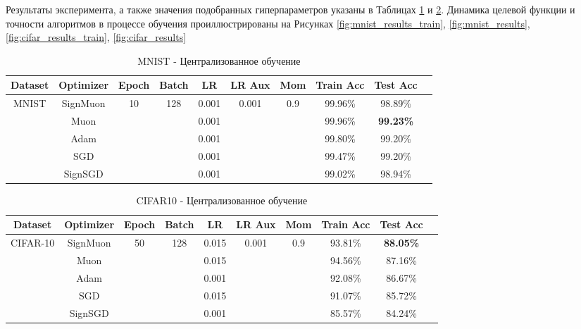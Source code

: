 \documentclass{article}
\begin{document}
Результаты эксперимента, а также значения подобранных гиперпараметров указаны в Таблицах \ref{tab:mnist_central} и \ref{tab:cifar_central}. Динамика целевой функции и точности алгоритмов в процессе обучения проиллюстрированы на Рисунках \ref{fig:mnist_results_train}, \ref{fig:mnist_results}, \ref{fig:cifar_results_train}, \ref{fig:cifar_results}
\vspace{-1em}
\begin{table}[h]
\centering
\caption{MNIST - Централизованное обучение}
\label{tab:mnist_central}
\small
\renewcommand{\arraystretch}{1.2}
\begin{tabular}{|c|c|c|c|c|c|c|c|c|c|}
\hline
\textbf{Dataset} & \textbf{Optimizer} & \textbf{Epoch} & \textbf{Batch} & \textbf{LR} & \textbf{LR Aux} & \textbf{Mom} & \textbf{Train Acc} & \textbf{Test Acc} \\
\hline
\multirow{5}{*}{MNIST} & SignMuon & \multirow{5}{*}{10} & \multirow{5}{*}{128} & 0.001 & \multirow{5}{*}{0.001} & \multirow{5}{*}{0.9} & 99.96\% & 98.89\% \\
\cline{2-2} \cline{5-5} \cline{8-9}
 & Muon & & & 0.001 & & & 99.96\% & \textbf{99.23\%} \\
\cline{2-2} \cline{5-5} \cline{8-9}
 & Adam & & & 0.001 & & & 99.80\% & 99.20\% \\
\cline{2-2} \cline{5-5} \cline{8-9}
 & SGD & & & 0.001 & & & 99.47\% & 99.20\% \\
\cline{2-2} \cline{5-5} \cline{8-9}
 & SignSGD & & & 0.001 & & & 99.02\% & 98.94\% \\
\hline
\end{tabular}
\end{table}

\vspace{-2em} 

\begin{table}[H]
\centering
\caption{CIFAR10 - Централизованное обучение}
\label{tab:cifar_central}
\small
\renewcommand{\arraystretch}{1.2}
\begin{tabular}{|c|c|c|c|c|c|c|c|c|c|}
\hline
\textbf{Dataset} & \textbf{Optimizer} & \textbf{Epoch} & \textbf{Batch} & \textbf{LR} & \textbf{LR Aux} & \textbf{Mom} & \textbf{Train Acc} & \textbf{Test Acc} \\
\hline
\multirow{5}{*}{CIFAR-10} & SignMuon & \multirow{5}{*}{50} & \multirow{5}{*}{128} & 0.015 & \multirow{5}{*}{0.001} & \multirow{5}{*}{0.9} & 93.81\% & \textbf{88.05\%} \\
\cline{2-2} \cline{5-5} \cline{8-9}
 & Muon & & & 0.015 & & & 94.56\% & 87.16\% \\
\cline{2-2} \cline{5-5} \cline{8-9}
 & Adam & & & 0.001 & & & 92.08\% & 86.67\% \\
\cline{2-2} \cline{5-5} \cline{8-9}
 & SGD & & & 0.015 & & & 91.07\% & 85.72\% \\
\cline{2-2} \cline{5-5} \cline{8-9}
 & SignSGD & & & 0.001 & & & 85.57\% & 84.24\% \\
\hline
\end{tabular}
\end{table}
\end{document}
